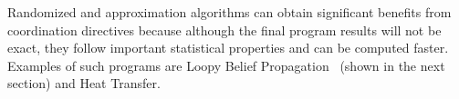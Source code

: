Randomized and approximation
algorithms can obtain significant benefits from coordination directives because although the final
program results will not be exact, they follow important statistical properties and can be computed faster.
Examples of such programs are Loopy Belief
Propagation~\cite{Gonzalez+al:aistats09paraml} (shown in the next section) and
Heat Transfer.

